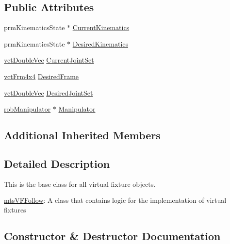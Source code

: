 \subsection*{Public Attributes}
\begin{DoxyCompactItemize}
\item 
prm\+Kinematics\+State $\ast$ \hyperlink{classmts_v_f_follow_a0adff05f67fe4bf9be72591e0fc22ace}{Current\+Kinematics}
\item 
prm\+Kinematics\+State $\ast$ \hyperlink{classmts_v_f_follow_a02185f7d37d06a02cd2a92e6226b5867}{Desired\+Kinematics}
\item 
\hyperlink{vct_dynamic_vector_types_8h_ade4b3068c86fb88f41af2e5187e491c2}{vct\+Double\+Vec} \hyperlink{classmts_v_f_follow_ae704f3167a578520448f6f47aa032aff}{Current\+Joint\+Set}
\item 
\hyperlink{vct_transformation_types_8h_a33da47f4deb2556b37a69a2c44b29d75}{vct\+Frm4x4} \hyperlink{classmts_v_f_follow_a3561088c012af44b6dcd0a54f6fce5ae}{Desired\+Frame}
\item 
\hyperlink{vct_dynamic_vector_types_8h_ade4b3068c86fb88f41af2e5187e491c2}{vct\+Double\+Vec} \hyperlink{classmts_v_f_follow_ae4c68fd6c7d03a6bcdb86d1e2e5dae60}{Desired\+Joint\+Set}
\item 
\hyperlink{classrob_manipulator}{rob\+Manipulator} $\ast$ \hyperlink{classmts_v_f_follow_ad30c27f37797a47a2461551aab20103a}{Manipulator}
\end{DoxyCompactItemize}
\subsection*{Additional Inherited Members}


\subsection{Detailed Description}
This is the base class for all virtual fixture objects. 

\hyperlink{classmts_v_f_follow}{mts\+V\+F\+Follow}\+: A class that contains logic for the implementation of virtual fixtures 

\subsection{Constructor \& Destructor Documentation}
\hypertarget{classmts_v_f_follow_a5f15e27b89b3d7f72ae070521e6a9eb6}{}
